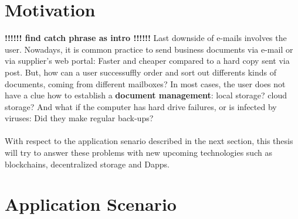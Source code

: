 
\section{Motivation}
\textbf{!!!!!! find catch phrase as intro !!!!!! }
Last downside of e-mails involves the user. Nowadays, it is common practice to send business documents via e-mail or via supplier\textquoteright s web portal: Faster and cheaper compared to a hard copy sent via post. But, how can a user successuffly order and sort out differents kinds of documents, coming from different mailboxes? In most cases, the user does not have a clue how to establish a \textbf{document management}: local storage? cloud storage? And what if the computer has hard drive failures, or is infected by viruses: Did they make regular back-ups?
\paragraph{}
With respect to the application senario described in the next section, this thesis will try to answer these problems with new upcoming technologies such as blockchains, decentralized storage and Dapps. 
 
\section {Application Scenario}
